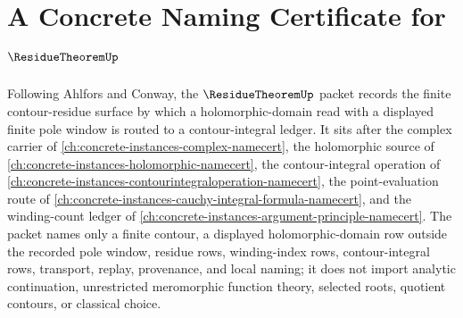\chapter{A Concrete Naming Certificate for $\ResidueTheoremUp$}
\label{ch:concrete-instances-residue-theorem-namecert}

Following Ahlfors and Conway, the $\ResidueTheoremUp$ packet records the finite contour-residue surface by which a holomorphic-domain read with a displayed finite pole window is routed to a contour-integral ledger. It sits after the complex carrier of \autoref{ch:concrete-instances-complex-namecert}, the holomorphic source of \autoref{ch:concrete-instances-holomorphic-namecert}, the contour-integral operation of \autoref{ch:concrete-instances-contourintegraloperation-namecert}, the point-evaluation route of \autoref{ch:concrete-instances-cauchy-integral-formula-namecert}, and the winding-count ledger of \autoref{ch:concrete-instances-argument-principle-namecert}. The packet names only a finite contour, a displayed holomorphic-domain row outside the recorded pole window, residue rows, winding-index rows, contour-integral rows, transport, replay, provenance, and local naming; it does not import analytic continuation, unrestricted meromorphic function theory, selected roots, quotient contours, or classical choice.


